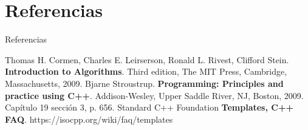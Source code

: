 \documentclass[aspectratio=169]{beamer}
\begin{document}
\section{Referencias}
\begin{frame}{Referencias}
  \begin{thebibliography}{9}
    Thomas H. Cormen, Charles E. Leirserson, Ronald L. Rivest, Clifford Stein.
    \textbf{Introduction to Algorithms}.
    Third edition, The MIT Press, Cambridge, Massachusetts, 2009.
    Bjarne Stroustrup.
    \textbf{Programming: Principles and practice using C++}.
    Addison-Wesley, Upper Saddle River, NJ, Boston, 2009. Capítulo 19 sección 3, p. 656.
    Standard C++ Foundation
    \textbf{Templates, C++ FAQ}. https://isocpp.org/wiki/faq/templates
  \end{thebibliography}
\end{frame}
\end{document}
